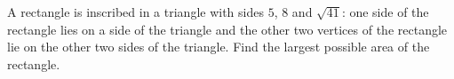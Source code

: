A rectangle is inscribed in a triangle with sides $5$, $8$ and $\sqrt{41}$: one side of the rectangle lies on a side of the triangle and the other two vertices of the rectangle lie on the other two sides of the triangle. Find the largest possible area of the rectangle.
